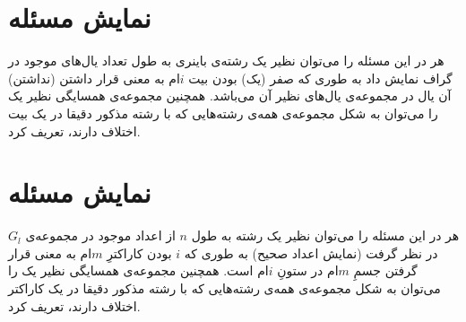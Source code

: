 \documentclass{article}
\begin{document}


\newpage


\section{نمایش مسئله }
هر  در این مسئله را می‌توان نظیر یک رشته‌ی باینری به طول تعداد یال‌های موجود در گراف نمایش داد به طوری که صفر (یک) بودن بیت $i$ام به معنی قرار داشتن (نداشتن) آن یال در مجموعه‌ی یال‌های نظیر آن  می‌باشد. همچنین مجموعه‌ی همسایگی نظیر یک  را می‌توان به شکل مجموعه‌ی همه‌ی رشته‌هایی که با رشته مذکور دقیقا در یک بیت اختلاف دارند، تعریف کرد.


\section{نمایش مسئله }
هر  در این مسئله را می‌توان نظیر یک رشته به طول $n$ از اعداد موجود در مجموعه‌ی $G_{l}$ در نظر گرفت (نمایش اعداد صحیح) به طوری که $i$ بودن کاراکترِ $m$ام به معنی قرار گرفتن جسمِ $m$ام در ستونِ $i$ام است. همچنین مجموعه‌ی همسایگی نظیر یک  را می‌توان به شکل مجموعه‌ی همه‌ی رشته‌هایی که با رشته مذکور دقیقا در یک کاراکتر اختلاف دارند، تعریف کرد.
\end{document}
